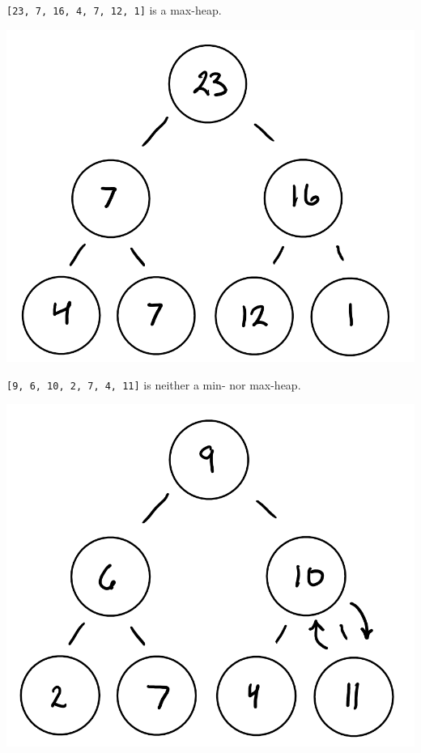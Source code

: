 \documentclass[12pt,twoside]{article}
\begin{document}
\begin{problems}
\begin{problemparts}
\begin{center}
    \end{center}
    {\tt [23, 7, 16, 4, 7, 12, 1]} is a max-heap.
    \begin{center}
        \includegraphics[scale=0.4]{Images/P1A3.PNG}
    \end{center}
    {\tt [9, 6, 10, 2, 7, 4, 11]} is neither a min- nor max-heap.
    \begin{center}
        \includegraphics[scale=0.4]{Images/P1A4i.PNG}

\end{center}
\end{problemparts}
\end{problems}
\end{document}
